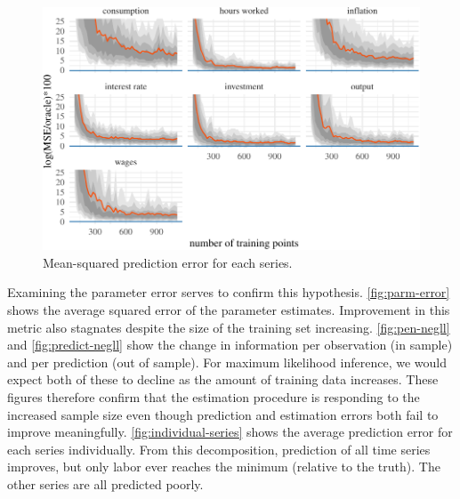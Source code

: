 \documentclass[11pt]{article}
\begin{document}
\begin{figure}[t]

{\centering \includegraphics{gfx/individual-series-1} 

}

\caption{Mean-squared prediction error for each series.}\label{fig:individual-series}
\end{figure}

Examining the parameter error serves to confirm this hypothesis.
\autoref{fig:parm-error} shows the average squared error of the
parameter estimates. Improvement in this metric also stagnates despite
the size of the training set increasing. \autoref{fig:pen-negll} and
\autoref{fig:predict-negll} show the change in information per
observation (in sample) and per prediction (out of sample). For maximum
likelihood inference, we would expect both of these to decline as the
amount of training data increases. These figures therefore confirm that
the estimation procedure is responding to the increased sample size even
though prediction and estimation errors both fail to improve
meaningfully. \autoref{fig:individual-series} shows the average
prediction error for each series individually. From this decomposition,
prediction of all time series improves, but only labor ever reaches the
minimum (relative to the truth). The other series are all predicted
poorly.
\end{document}
